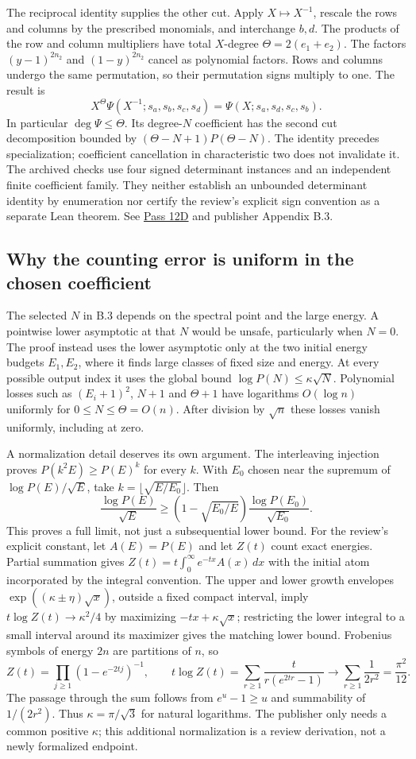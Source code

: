\documentclass[11pt,letterpaper]{article}
\theoremstyle{definition}\newtheorem{definition}[theorem]{Definition}\newtheorem{example}[theorem]{Example}
\theoremstyle{remark}\newtheorem{remark}[theorem]{Remark}
\newcommand{\aud}[2]{\href{https://github.com/nousentllc/VP-VNP-Review/blob/567303d0bcf4f9d54390437b137752446e58ccd6/#1}{#2}}
\begin{document}
The reciprocal identity supplies the other cut. Apply $X\mapsto X^{-1}$, rescale the rows and columns by the prescribed monomials, and interchange $b,d$. The products of the row and column multipliers have total $X$-degree $\Theta=2(e_1+e_2)$. The factors $(y-1)^{2n_2}$ and $(1-y)^{2n_2}$ cancel as polynomial factors. Rows and columns undergo the same permutation, so their permutation signs multiply to one. The result is
\[
 X^\Theta\Psi(X^{-1};s_a,s_b,s_c,s_d)
       =\Psi(X;s_a,s_d,s_c,s_b).
\]
In particular $\deg\Psi\le\Theta$. Its degree-$N$ coefficient has the second cut decomposition bounded by $(\Theta-N+1)P(\Theta-N)$. The identity precedes specialization; coefficient cancellation in characteristic two does not invalidate it. The archived checks use four signed determinant instances and an independent finite coefficient family. They neither establish an unbounded determinant identity by enumeration nor certify the review's explicit sign convention as a separate Lean theorem. See \aud{passes/12d-counting-and-minors.md}{Pass 12D} and publisher Appendix B.3.

\subsection{Why the counting error is uniform in the chosen coefficient}
The selected $N$ in B.3 depends on the spectral point and the large energy. A pointwise lower asymptotic at that $N$ would be unsafe, particularly when $N=0$. The proof instead uses the lower asymptotic only at the two initial energy budgets $E_1,E_2$, where it finds large classes of fixed size and energy. At every possible output index it uses the global bound $\log P(N)\le\kappa\sqrt N$. Polynomial losses such as $(E_i+1)^2$, $N+1$ and $\Theta+1$ have logarithms $O(\log n)$ uniformly for $0\le N\le\Theta=O(n)$. After division by $\sqrt n$ these losses vanish uniformly, including at zero.

A normalization detail deserves its own argument. The interleaving injection proves $P(k^2E)\ge P(E)^k$ for every $k$. With $E_0$ chosen near the supremum of $\log P(E)/\sqrt E$, take $k=\lfloor\sqrt{E/E_0}\rfloor$. Then
\[
 \frac{\log P(E)}{\sqrt E}\ge
 \left(1-\sqrt{E_0/E}\right)\frac{\log P(E_0)}{\sqrt{E_0}}.
\]
This proves a full limit, not just a subsequential lower bound. For the review's explicit constant, let $A(E)=P(E)$ and let $Z(t)$ count exact energies. Partial summation gives $Z(t)=t\int_0^\infty e^{-tx}A(x)\,dx$ with the initial atom incorporated by the integral convention. The upper and lower growth envelopes $\exp((\kappa\pm\eta)\sqrt x)$, outside a fixed compact interval, imply $t\log Z(t)\to\kappa^2/4$ by maximizing $-tx+\kappa\sqrt x$; restricting the lower integral to a small interval around its maximizer gives the matching lower bound. Frobenius symbols of energy $2n$ are partitions of $n$, so
\[
 Z(t)=\prod_{j\ge1}(1-e^{-2tj})^{-1},\qquad
 t\log Z(t)=\sum_{r\ge1}\frac{t}{r(e^{2tr}-1)}\longrightarrow
 \sum_{r\ge1}\frac1{2r^2}=\frac{\pi^2}{12}.
\]
The passage through the sum follows from $e^u-1\ge u$ and summability of $1/(2r^2)$. Thus $\kappa=\pi/\sqrt3$ for natural logarithms. The publisher only needs a common positive $\kappa$; this additional normalization is a review derivation, not a newly formalized endpoint.
\end{document}
